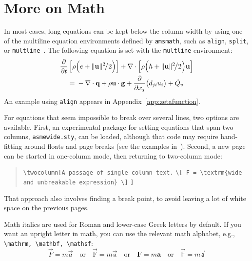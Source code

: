\documentclass[balance,nocopyright,upint,varvw,hyphenate,barcolor=Goldenrod3,german]{asmejour}%
\begin{document}
\section{More on Math}

In most cases, long equations can be kept below the column width by using one of the multiline equation environments defined by \texttt{amsmath}, 
such as \texttt{align}, \texttt{split}, or \texttt{multline}~\cite{amsmath}. The following equation is set with the \texttt{multline} environment:
\begin{multline}
\frac{\partial}{\partial t}\left[\rho\Bigl(e + \lVert\mathbf{u}\rVert^2\mspace{-3mu}\big/2\Bigr)\right]  + \nabla\cdot\left[\rho\Bigl(h + \lVert\mathbf{u}\rVert^2\mspace{-3mu}\big/2 \Bigr)\mathbf{u}\right]\\
 ={}-\nabla \cdot \mathbf{q} +  \rho \mathbf{u}\cdot\mathbf{g}+ \frac{\partial}{\partial x_j}\bigl(d_{ji}u_i\bigr) + \dot{Q}_v\label{eqn:energy}
\end{multline}
An example using \texttt{align} appears in Appendix~\ref{app:zetafunction}. 

For equations that seem impossible to break over several lines, two options are available.  First,
an experimental package for setting equations that span two columns, \texttt{asmewide.sty}, can be loaded, although that code may require hand-fitting around floats and page breaks (see the examples in~\cite{lienhard2025}). Second, a new page can be started in one-column mode, then returning to two-column mode: 

\begin{quote}\raggedright
\verb|\twocolumn[A passage of single column text.|
\verb|\[ F = \textrm{wide and unbreakable expression} \]|
\verb|]|
\end{quote}
That approach also involves finding a break point, to avoid leaving a lot of white space on the previous pages.

Math italics are used for Roman and lower-case Greek letters by default.  If you want an upright letter in math, you can use the relevant math alphabet, e.g., \verb|\mathrm, \mathbf, \mathsf|:
\begin{equation}\label{eqn:newton2}
\vec{F} = m \vec{a} \quad\textrm{or}\quad \vec{\mathrm{F}} = m \vec{\mathrm{a}} \quad\textrm{or}\quad \mathbf{F} = m \mathbf{a} \quad\textrm{or}\quad \vec{\mathsf{F}} = m \vec{\mathsf{a}}
\end{equation}
\end{document}
